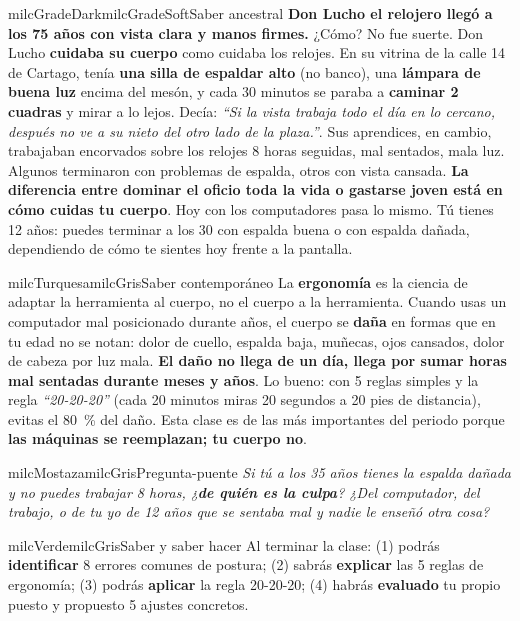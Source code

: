 \documentclass[11pt,letterpaper]{article}
\begin{document}
\begin{softbox}{milcGradeDark}{milcGradeSoft}{Saber ancestral}
\textbf{Don Lucho el relojero llegó a los 75 años con vista clara y manos firmes.} ¿Cómo? No fue suerte. Don Lucho \textbf{cuidaba su cuerpo} como cuidaba los relojes. En su vitrina de la calle 14 de Cartago, tenía \textbf{una silla de espaldar alto} (no banco), una \textbf{lámpara de buena luz} encima del mesón, y cada 30 minutos se paraba a \textbf{caminar 2 cuadras} y mirar a lo lejos. Decía: \emph{``Si la vista trabaja todo el día en lo cercano, después no ve a su nieto del otro lado de la plaza.''}. Sus aprendices, en cambio, trabajaban encorvados sobre los relojes 8 horas seguidas, mal sentados, mala luz. Algunos terminaron con problemas de espalda, otros con vista cansada. \textbf{La diferencia entre dominar el oficio toda la vida o gastarse joven está en cómo cuidas tu cuerpo}. Hoy con los computadores pasa lo mismo. Tú tienes 12 años: puedes terminar a los 30 con espalda buena o con espalda dañada, dependiendo de cómo te sientes hoy frente a la pantalla.
\end{softbox}

\begin{softbox}{milcTurquesa}{milcGris}{Saber contemporáneo}
La \textbf{ergonomía} es la ciencia de adaptar la herramienta al cuerpo, no el cuerpo a la herramienta. Cuando usas un computador mal posicionado durante años, el cuerpo se \textbf{daña} en formas que en tu edad no se notan: dolor de cuello, espalda baja, muñecas, ojos cansados, dolor de cabeza por luz mala. \textbf{El daño no llega de un día, llega por sumar horas mal sentadas durante meses y años}. Lo bueno: con 5 reglas simples y la regla \emph{``20-20-20''} (cada 20 minutos miras 20 segundos a 20 pies de distancia), evitas el 80~\% del daño. Esta clase es de las más importantes del periodo porque \textbf{las máquinas se reemplazan; tu cuerpo no}.
\end{softbox}

\begin{softbox}{milcMostaza}{milcGris}{Pregunta-puente}
\textit{Si tú a los 35 años tienes la espalda dañada y no puedes trabajar 8 horas, ¿\textbf{de quién es la culpa}? ¿Del computador, del trabajo, o de tu yo de 12 años que se sentaba mal y nadie le enseñó otra cosa?}
\end{softbox}

\begin{softbox}{milcVerde}{milcGris}{Saber y saber hacer}
Al terminar la clase: (1) podrás \textbf{identificar} 8 errores comunes de postura; (2) sabrás \textbf{explicar} las 5 reglas de ergonomía; (3) podrás \textbf{aplicar} la regla 20-20-20; (4) habrás \textbf{evaluado} tu propio puesto y propuesto 5 ajustes concretos.
\end{softbox}
\end{document}

